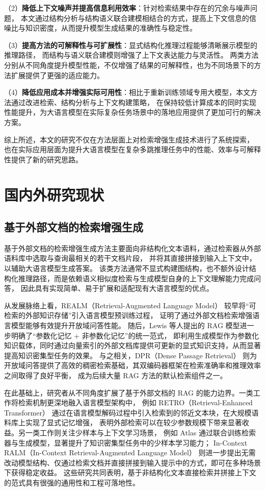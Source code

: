 （2）\textbf{降低上下文噪声并提高信息利用效率}：针对检索结果中存在的冗余与噪声问题，
本文通过结构分析与结构语义联合建模相结合的方式，提高上下文信息的信噪比与知识密度，从而提升模型生成结果的准确性与稳定性。

（3）\textbf{提高方法的可解释性与可扩展性}：显式结构化推理过程能够清晰展示模型的推理路径，
而结构与语义联合建模则增强了上下文表达能力与灵活性。
两类方法分别从不同角度提升模型性能，不仅增强了结果的可解释性，也为不同场景下的方法扩展提供了更强的适应能力。

（4）\textbf{降低应用成本并增强实际可用性}：相比于重新训练领域专用大模型，本文方法通过改进检索、结构分析与上下文构建策略，
在保持较低计算成本的同时实现性能提升，为大语言模型在实际复杂任务场景中的落地应用提供了更加可行的解决方案。

综上所述，本文的研究不仅在方法层面上对检索增强生成技术进行了系统探索，
也在实际应用层面为提升大语言模型在复杂多跳推理任务中的性能、效率与可解释性提供了新的研究思路。

\section{国内外研究现状}

\subsection{基于外部文档的检索增强生成}

基于外部文档的检索增强生成方法主要面向非结构化文本语料，通过检索器从外部语料库中选取与查询最相关的若干文档片段，
并将其直接拼接到输入上下文中，以辅助大语言模型生成答案。
该类方法通常不显式构建图结构，也不额外设计结构化推理路径，而是依赖语义相似度检索与生成模型自身的上下文理解能力完成问答，
因此具有实现简单、易于扩展和适配现有大语言模型的优点。

从发展脉络上看，REALM（Retrieval-Augmented Language Model）\cite{guu2020retrieval} 较早将“可检索的外部知识存储”引入语言模型预训练过程，
证明了通过外部文档检索增强语言模型能够有效提升开放域问答性能。
随后，Lewis\cite{lewis2020retrieval} 等人提出的 RAG 模型进一步明确了“参数化记忆 + 非参数化记忆”的统一范式，
即利用生成模型作为参数化知识载体，同时通过向量索引的外部文档库提供可更新的显式知识支持，从而显著提高知识密集型任务的效果。
与之相关，DPR（Dense Passage Retrieval）\cite{karpukhin2020dense} 则为开放域问答提供了高效的稠密检索基础，其双编码器框架在检索准确率和推理效率之间取得了良好平衡，
成为后续大量 RAG 方法的默认检索组件之一。

在此基础上，研究者从不同角度扩展了基于外部文档的 RAG 的能力边界。一类工作将检索机制更深地融入语言模型架构中，
例如 RETRO（Retrieval-Enhanced Transformer）\cite{borgeaud2022improving} 通过在语言模型解码过程中引入检索到的邻近文本块，在大规模语料库上实现了显式记忆增强，
表明外部检索可以在较少参数规模下带来显著收益。另一类工作则关注少样本与上下文学习场景，
例如 Atlas\cite{izacard2022few} 通过联合训练检索器与生成模型，显著提升了知识密集型任务中的少样本学习能力；
In-Context RALM（In-Context Retrieval-Augmented Language Model）\cite{ram2023context} 则进一步提出无需改动模型结构、仅通过检索文档并直接拼接到输入提示中的方式，即可在多种场景下获得稳定收益。
这些研究共同表明，基于非结构化文本直接检索并拼接上下文的范式具有很强的通用性和工程可落地性。

